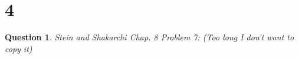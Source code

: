 \documentclass{article}
\newtheorem{question}{Question}
\begin{document}
\section*{4}
\begin{myBox}[]{}
    \begin{question}
        Stein and Shakarchi Chap. 8 Problem 7: (Too long I don't want to copy it)
        
        \begin{comment}
        Applying ideas of Carath'eodory, Koebe gave a proof of the Riemann mapping
        theorem by constructing (more explicitly) a sequence of functions that converges
        to the desired conformal map.

        Starting with a Koebe domain, that is, a simply connected domain $K_0\subset\mathbb{D}$ that
        is not all of $\mathbb{D}$, and which contains the origin, the strategy is to find an injective
        function $f_0$ such that $f_0(K_0)=K_1$ is a Koebe domain “larger” than $K_0$. Then, one
        iterates this process, finally obtaining functions $F_n=f_n\circ...\circ f_0 : K_0 \rightarrow\mathbb{D}$ such
        that $F_n(K_0) = K_{n+1}$ and $\lim F_n = F$ is a conformal map from $K_0$ to $\mathbb{D}$.

        The \textbf{inner radius }of a region $K\subset \mathbb{D}$ that contains the origin is defined by
        $r_K = \sup\{\rho \geq 0 : \mathbb{D}(0, \rho) \subseteq K\}$. Also, a holomorphic injection $f : K \rightarrow\mathbb{D}$ is said to
        be an \textbf{expansion} if $f(0) = 0$ and $|f(z)| > |z|$ for all $z \in K\setminus\{0\}$.

        \begin{itemize}
            \item[(a)] Prove that if $f$ is an expansion, then $r_{f(K)}\geq r_K$ and $|f'(0)|>1$.
        \end{itemize}

        Suppose we begin with a Koebe domain $K_0$ and a sequence of expansions $\{f_0,f_1,...,f_n,...\}$ so that $K_{n+1}=f_n(K_n)$ are also Koebe domains.
        We then define holomorphic maps $F_n:K_0\rightarrow\mathbb{D}$ by $F_n=f_n\circ...\circ f_0$.

        \begin{itemize}
            \item[(b)] Prove that for each $n$, the function $F_n$ is an expansion. Moreover, $F_n'(0)=\prod_{k=0}^{n}f_k'(0)$, and conclude that $\lim_{n\rightarrow\infty}|f_n'(0)|=1$.
            \item[(c)] Show that if the sequence is osculating, that is, $r_{K_n}\rightarrow 1$ as $n\rightarrow\infty$,
            then $\{F_n\}$ converges uniformly on compact subsets of $K_0$ to a conformal map $F:K_0\rightarrow\mathbb{D}$.
        \end{itemize}


\end{comment}
\end{question}
\end{myBox}
\end{document}
